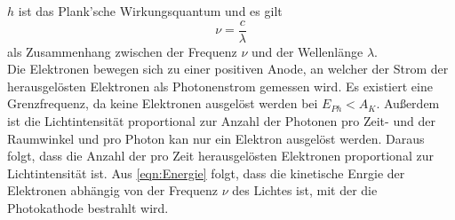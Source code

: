 $h$ ist das Plank'sche Wirkungsquantum und es gilt
\begin{equation}
    \nu = \frac{c}{\lambda}
    \label{eqn:Frequenz}
\end{equation}
als Zusammenhang zwischen der Frequenz $\nu$ und der Wellenlänge $\lambda$.\\
Die Elektronen bewegen sich zu einer positiven Anode, an welcher der Strom der herausgelösten
Elektronen als Photonenstrom gemessen wird. Es existiert eine Grenzfrequenz, da keine Elektronen 
ausgelöst werden bei $E_{Ph} < A_K$. Außerdem ist die Lichtintensität proportional zur Anzahl der 
Photonen pro Zeit- und der Raumwinkel und pro Photon kan nur ein Elektron ausgelöst werden.
Daraus folgt, dass die Anzahl der pro Zeit herausgelösten Elektronen proportional zur Lichtintensität ist.
Aus \autoref{eqn:Energie} folgt, dass die kinetische Enrgie der Elektronen abhängig von der Frequenz $\nu$ des
Lichtes ist, mit der die Photokathode bestrahlt wird.

